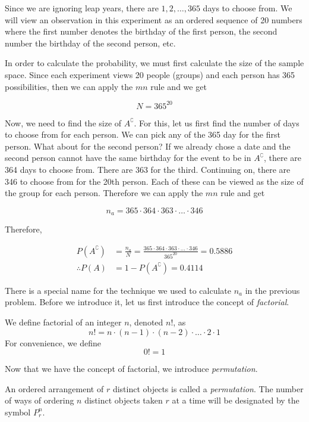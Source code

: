 \documentclass[11pt]{article}
\theoremstyle{definition}
\begin{document}
Since we are ignoring leap years, there are $1, 2, \ldots, 365$ days to choose from. We will view an observation in this experiment as an ordered sequence of 20 numbers where the first number denotes the birthday of the first person, the second number the birthday of the second person, etc.

In order to calculate the probability, we must first calculate the size of the sample space. Since each experiment views 20 people (groups) and each person has 365 possibilities, then we can apply the $mn$ rule and we get

$$
	N = 365^{20}
$$

Now, we need to find the size of $A^\complement$. For this, let us first find the number of days to choose from for each person. We can pick any of the 365 day for the first person. What about for the second person? If we already chose a date and the second person cannot have the same birthday for the event to be in $A^\complement$, there are 364 days to choose from. There are 363 for the third. Continuing on, there are 346 to choose from for the 20th person. Each of these can be viewed as the size of the group for each person. Therefore we can apply the $mn$ rule and get

$$
	n_a = 365 \cdot 364 \cdot 363 \cdot \ldots \cdot 346
$$

Therefore,

$$
	\begin{aligned}
		P\left(A^\complement\right) & = \frac{n_a}{N} = \frac{365 \cdot 364 \cdot 363 \cdot \ldots \cdot 346}{365^{20}} = 0.5886 \\
		\therefore P(A) & = 1 - P\left(A^\complement\right) = 0.4114
	\end{aligned}
$$

\indent There is a special name for the technique we used to calculate $n_a$ in the previous problem. Before we introduce it, let us first introduce the concept of \textit{factorial}.

\begin{shaded}
	We define factorial of an integer $n$, denoted $n!$, as
	$$
		n! = n \cdot (n-1) \cdot (n-2) \cdot \ldots \cdot 2 \cdot 1
	$$
	For convenience, we define
	$$
		0! = 1
	$$
\end{shaded}

Now that we have the concept of factorial, we introduce \textit{permutation}.

\begin{shaded}
	An ordered arrangement of $r$ distinct objects is called a \textit{permutation}. The number of ways of ordering $n$ distinct objects taken $r$ at a time will be designated by the symbol $P^n_r$.
\end{shaded}
\end{document}
